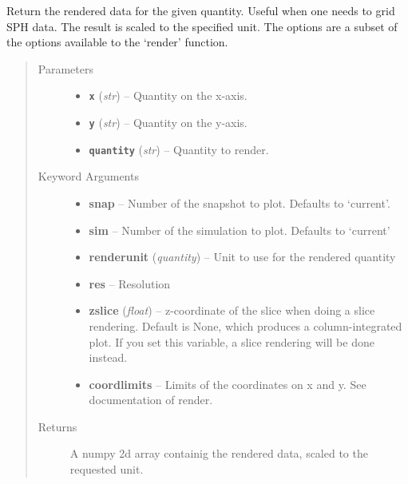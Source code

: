 \documentclass[letterpaper,10pt,english]{sphinxmanual}
\begin{document}
\begin{fulllineitems}
\label{index:facade.get_render_data}
Return the rendered data for the given quantity. Useful when one needs
to grid SPH data. The result is scaled to the specified unit. The options are
a subset of the options available to the `render' function.
\begin{quote}\begin{description}
\item[{Parameters}] \leavevmode\begin{itemize}
\item {} 
\textbf{\texttt{x}} (\emph{str}) -- Quantity on the x-axis.

\item {} 
\textbf{\texttt{y}} (\emph{str}) -- Quantity on the y-axis.

\item {} 
\textbf{\texttt{quantity}} (\emph{str}) -- Quantity to render.

\end{itemize}

\item[{Keyword Arguments}] \leavevmode\begin{itemize}
\item {} 
\textbf{snap} --
Number of the snapshot to plot. Defaults to `current'.

\item {} 
\textbf{sim} --
Number of the simulation to plot. Defaults to `current'

\item {} 
\textbf{renderunit} (\emph{quantity}) --
Unit to use for the rendered quantity

\item {} 
\textbf{res} --
Resolution

\item {} 
\textbf{zslice} (\emph{float}) --
z-coordinate of the slice when doing a slice rendering.
Default is None, which produces a column-integrated plot.
If you set this variable, a slice rendering will be
done instead.

\item {} 
\textbf{coordlimits} --
Limits of the coordinates on x and y. See documentation
of render.

\end{itemize}

\item[{Returns}] \leavevmode
A numpy 2d array containig the rendered data, scaled to the requested unit.

\end{description}\end{quote}

\end{fulllineitems}
\end{document}
